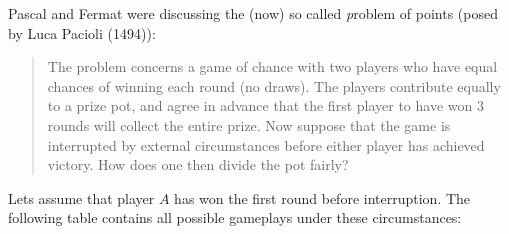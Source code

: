 \documentclass[twoside,11pt,a4paper]{article}
\newif\ifEN \ENtrue	                %
\def\tr|#1|#2|{\ifEN #2\else #1\fi}     %
\theoremstyle{definition}
\def\aside#1{\marginpar{\scriptsize #1}}
\begin{document}
\tr|Pascal und Fermat diskutierten, das (inzwischen) sogenannte \emph{Teilungsproblem} (ursprünglich gestellt von Luca Paciola (1494)).
   |Pascal and Fermat were discussing the (now) so called \emph{problem of points} (posed by  Luca Pacioli (1494)): |
\begin{quote}
  \tr|Beim Teilungsproblem geht es um ein (faires) Glücksspiel zwischen zwei Spielern, bei dem es in jeder Runde einen Sieger gibt
      (es ist also kein Unentscheiden möglich),  z.B. könnten die beiden Spieler ganz einfach mehrmals eine Münze werfen.
      Vor Spielbeginn zahlen beide Spieler den gleichen Einsatz ein. Der erste Spieler, der 3 Runden gewinnt bekommt den ganzen Einsatz, 
      Nehmen wir nun an, dass das Spiel unterbrochen werden muss bevor einer der beiden Spieler gewonnen hat. 
      Wie teilen die beiden Spieler den Einsatz nun gerechtesten auf?
     |The problem concerns a game of chance with two players who have equal chances of winning each round (no draws).
      The players contribute equally to a prize pot,
      and agree in advance that the first player to have won  3 rounds will collect the entire prize. 
      Now suppose that the game is interrupted by external circumstances before either player has achieved victory.
      How does one then divide the pot fairly? |
\end{quote}
\tr|Nehmen wir an, der Spieler $A$ hat die erste Runde gewonnen, bevor das Spiel unterbrochen wurde. Die folgende Tabelle enthält alle möglichen     Spielverläufe unter diesen Umstanden:
   |Lets assume that player $A$ has won the first round before interruption. The following table contains all possible gameplays under these circumstances: |
\par\medskip
\end{document}
